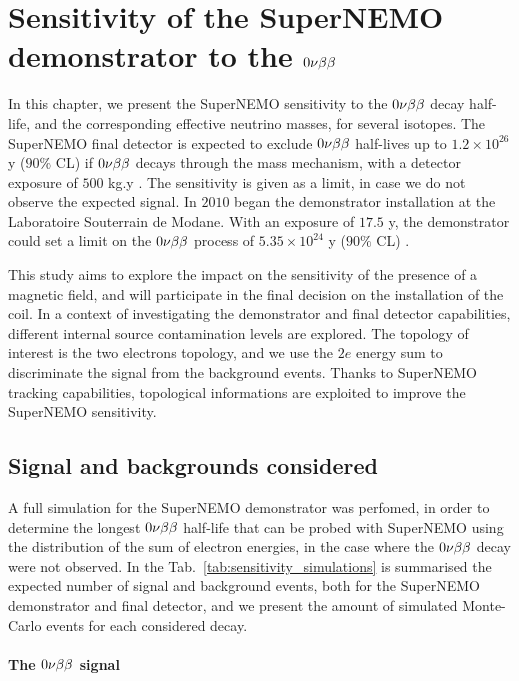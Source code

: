 \chapter{Sensitivity of the SuperNEMO demonstrator to the $0\nu\beta\beta$}
\label{ch:sensitivity}


In this chapter, we present the SuperNEMO sensitivity to the $0\nu\beta\beta$ decay half-life, and the corresponding effective neutrino masses, for several isotopes.
The SuperNEMO final detector is expected to exclude $0\nu\beta\beta$ half-lives up to $1.2\times 10^{26}$ y ($90\%$ CL) if $0\nu\beta\beta$ decays through the mass mechanism, with a detector exposure of $500$ kg.y \cite{art:SuperNEMO2010}.
The sensitivity is given as a limit, in case we do not observe the expected signal.
In $2010$ began the demonstrator installation at the Laboratoire Souterrain de Modane.
With an exposure of $17.5$ y, the demonstrator could set a limit on the $0\nu\beta\beta$ process of $5.35\times 10^{24}$ y ($90\%$ CL) \cite{CalvezThesis}.

This study aims to explore the impact on the sensitivity of the presence of a magnetic field, and will participate in the final decision on the installation of the coil.
In a context of investigating the demonstrator and final detector capabilities, different internal source contamination levels are explored.
The topology of interest is the two electrons topology, and we use the $2e$ energy sum to discriminate the signal from the background events.
Thanks to SuperNEMO tracking capabilities, topological informations are exploited to improve the SuperNEMO sensitivity.



\section{Signal and backgrounds considered}

A full simulation for the SuperNEMO demonstrator was perfomed, in order to determine the longest $0\nu\beta\beta$ half-life that can be probed with SuperNEMO using the distribution of the sum of electron energies, in the case where the $0\nu\beta\beta$ decay were not observed.
In the Tab.~\ref{tab:sensitivity_simulations} is summarised the expected number of signal and background events, both for the SuperNEMO demonstrator and final detector, and we present the amount of simulated Monte-Carlo events for each considered decay.

\subsubsection*{The $0\nu\beta\beta$ signal}


